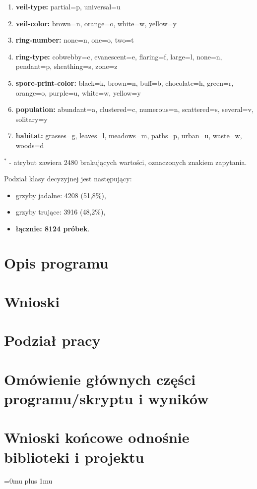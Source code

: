 \documentclass[10pt,a4paper]{article}
\begin{document}
\begin{enumerate}
	\item \textbf{veil-type:} partial=p, universal=u
	\item \textbf{veil-color:} brown=n, orange=o, white=w, yellow=y
	\item \textbf{ring-number:} none=n, one=o, two=t
	\item \textbf{ring-type:} cobwebby=c, evanescent=e, flaring=f, large=l, none=n, pendant=p, sheathing=s, zone=z
	\item \textbf{spore-print-color:} black=k, brown=n, buff=b, chocolate=h, green=r, orange=o, purple=u, white=w, yellow=y
	\item \textbf{population:} abundant=a, clustered=c, numerous=n, scattered=s, several=v, solitary=y
	\item \textbf{habitat:} grasses=g, leaves=l, meadows=m, paths=p, urban=u, waste=w, woods=d
\end{enumerate}
$^*$ - atrybut zawiera 2480 brakujących wartości, oznaczonych znakiem zapytania.
\vskip 0.2in

Podział klasy decyzyjnej jest następujący:
\begin{itemize}[label=-]
	\item grzyby jadalne: 4208 (51,8\%),
	\item grzyby trujące: 3916 (48,2\%),
	\item \textbf{łącznie: 8124 próbek}.
\end{itemize}
\section{Opis programu}

\section{Wnioski}

\section{Podział pracy}


\section{Omówienie głównych części programu/skryptu i wyników}

\section{Wnioski końcowe odnośnie biblioteki i projektu}

\Urlmuskip=0mu plus 1mu\relax
{}

\end{document}
